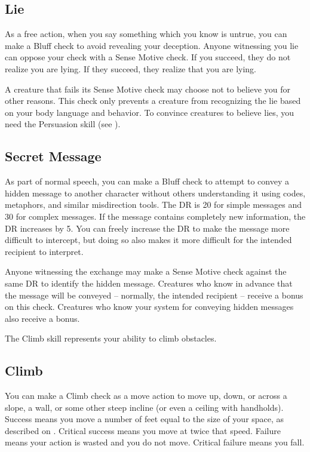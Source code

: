     \subsection{Lie}
        As a free action, when you say something which you know is untrue, you can make a Bluff check to avoid revealing your deception. Anyone witnessing you lie can oppose your check with a Sense Motive check. If you succeed, they do not realize you are lying. If they succeed, they realize that you are lying.

        A creature that fails its Sense Motive check may choose not to believe you for other reasons. This check only prevents a creature from recognizing the lie based on your body language and behavior. To convince creatures to believe lies, you need the Persuasion skill (see ).

    \subsection{Secret Message}
        As part of normal speech, you can make a Bluff check to attempt to convey a hidden message to another character without others understanding it using codes, metaphors, and similar misdirection tools. The DR is 20 for simple messages and 30 for complex messages. If the message contains completely new information, the DR increases by 5. You can freely increase the DR to make the message more difficult to intercept, but doing so also makes it more difficult for the intended recipient to interpret.

        Anyone witnessing the exchange may make a Sense Motive check against the same DR to identify the hidden message. Creatures who know in advance that the message will be conveyed -- normally, the intended recipient -- receive a  bonus on this check. Creatures who know your system for conveying hidden messages also receive a  bonus.

    The Climb skill represents your ability to climb obstacles.

    \subsection{Climb}
        You can make a Climb check as a move action to move up, down, or across a slope, a wall, or some other steep incline (or even a ceiling with handholds). Success means you move a number of feet equal to the size of your space, as described on . Critical success means you move at twice that speed. Failure means your action is wasted and you do not move. Critical failure means you fall.

